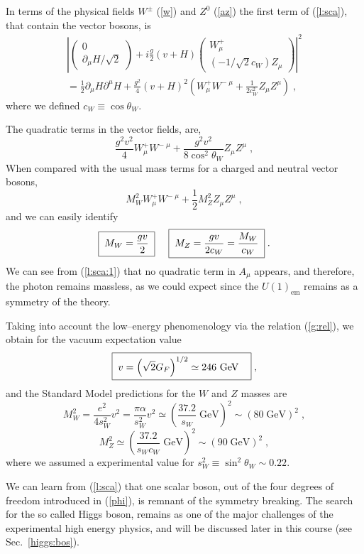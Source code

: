 \documentclass[12pt]{report}
\def\text#1{{\scriptstyle\mathrm{#1}}}
\newcommand{\del}{\partial}
\newcommand{\ba}{\begin{array}}
\newcommand{\ea}{\end{array}}
\begin{document}
In terms of the physical fields $W^\pm$ (\ref{w}) and  $Z^0$
(\ref{az}) the first term of (\ref{l:sca}), that contain the
vector bosons, is
\begin{eqnarray}
\left|
		\left( \ba{c}
	      		0\\
	      		\del_\mu H/\sqrt{2}
              \ea \right) + 
i \frac{g}{2} (v + H)	\left( \ba{c}
	      		W_\mu^+\\
	      		(-1/\sqrt{2}c_W) Z_\mu
              \ea \right) \right|^2 
\nonumber \\
= \frac{1}{2} \del_\mu H \del^\mu H +
\frac{g^2}{4} (v + H)^2 \left(W_\mu^+ W^{- \; \mu} + 
\frac{1}{2 c_W^2} Z_\mu Z^\mu \right) \; ,
\label{l:sca:1}
\end{eqnarray}
where we defined $c_W \equiv \cos\theta_W$. 

The quadratic terms in the vector fields, are,
\[
\frac{g^2 v^2}{4} W_\mu^+ W^{- \; \mu}  + 
\frac{g^2 v^2}{8\cos^2\theta_W} Z_\mu Z^\mu \; ,
\]
When compared with the usual mass terms for a charged and neutral
vector bosons,
\[
M_W^2 W_\mu^+ W^{- \; \mu}  + \frac{1}{2} M_Z^2 Z_\mu Z^\mu \; ,
\]
and we can easily identify
\begin{equation}
\fbox{$ \; \displaystyle{M_W = \frac{g v}{2}} \; $} \;\;\;\;\; 
\fbox{$ \; \displaystyle{M_Z = \frac{g v}{2 c_W} = \frac{M_W}{c_W}} \;
$} \; .
\label{mw:mz}
\end{equation}
We can see from (\ref{l:sca:1}) that no quadratic term in $A_\mu$
appears, and therefore, the photon remains massless, as we could
expect since the $U(1)_{\text{em}}$ remains as a symmetry of the
theory. 

Taking into account the low--energy phenomenology via the relation
(\ref{g:rel}), we obtain for the vacuum expectation value
\begin{equation}
\fbox{$ \; \displaystyle{v = \left( \sqrt{2} G_F\right )^{1/2} 
\simeq 246}$ GeV \; } \; ,
\label{v:num}
\end{equation}
and the Standard Model predictions for the $W$ and $Z$ masses are 
\[
M_W^2 = \frac{e^2}{4 s_W^2} v^2 =  \frac{\pi \alpha}{s_W^2} v^2
\simeq \left(\frac{37.2}{s_W} \; \mbox{GeV} \right)^2 
\sim (80 \; \mbox{GeV})^2 \; ,
\]
\[
M_Z^2 \simeq \left(\frac{37.2}{s_W c_W} \; \mbox{GeV}\right)^2 \sim
(90 \; \mbox{GeV})^2 \; ,
\]
where we assumed a experimental value for $s_W^2 \equiv \sin^2\theta_W
\sim 0.22$.

We can learn from (\ref{l:sca}) that one scalar boson, out of the
four degrees of freedom introduced in (\ref{phi}), is remnant of the
symmetry breaking. The search for the so called Higgs boson, remains
as one of the major challenges of the experimental high energy
physics, and will be discussed later in this course (see Sec.\
\ref{higgs:bos}).
\end{document}
